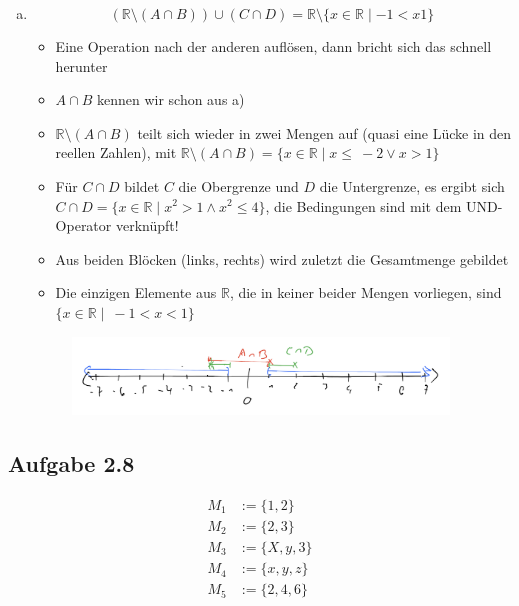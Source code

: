 \documentclass{standalone}
\begin{document}
\begin{enumerate}[a)]
    \item $$(\mathbb{R} \setminus (A \cap B))\cup (C \cap D) = \mathbb{R} \setminus \{x \in \mathbb{R} \mid -1 < x 1\}$$
    \begin{itemize}
        \item Eine Operation nach der anderen auflösen, dann bricht sich das schnell herunter
        \item $A \cap B$ kennen wir schon aus a)
        \item $\mathbb{R} \setminus (A \cap B)$ teilt sich wieder in zwei Mengen auf (quasi eine Lücke in den reellen Zahlen), mit 
        $\mathbb{R} \setminus (A \cap B) = \{x \in \mathbb{R} \mid x \leq\ -2 \vee x > 1\}$
        \item Für $C \cap D$ bildet $C$ die Obergrenze und $D$ die Untergrenze, es ergibt sich \\
        $C \cap D = \{x \in \mathbb{R} \mid x^2>1 \wedge x^2 \leq 4\}$, die Bedingungen sind mit dem UND-Operator verknüpft!
        \item Aus beiden Blöcken (links, rechts) wird zuletzt die Gesamtmenge gebildet
        \item Die einzigen Elemente aus $\mathbb{R}$, die in keiner beider Mengen vorliegen, sind \\
        $\{x \in \mathbb{R} \mid \ -1 < x < 1\}$
    \end{itemize}
    \begin{figure}[htpb]
        \centering
        \includegraphics[width=10cm]{img/2_7_f}
    \end{figure}
    \FloatBarrier
\end{enumerate}

\subsection{Aufgabe 2.8}

\begin{align}
    M_1&:=\{1,2\} \\
    M_2&:=\{2,3\} \\
    M_3&:=\{X,y,3\} \\
    M_4&:=\{x,y,z\} \\
    M_5&:=\{2,4,6\}
\end{align}
\end{document}
